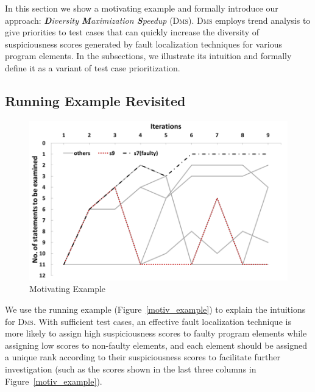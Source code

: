 
In this section we show a motivating example and formally introduce our approach: {\em \textbf{D}iversity \textbf{M}aximization \textbf{S}peedup} (\textsc{Dms}). \textsc{Dms} employs trend analysis to give priorities to test cases that can quickly increase the diversity of suspiciousness scores generated by fault localization techniques for various program elements.
In the subsections, we illustrate its intuition and formally define it as a variant of test case prioritization.

\subsection{Running Example Revisited}\label{sec.motive}



\begin{figure}[!htbp]
    \centering
    \includegraphics[width=12cm]{motive_1.png}
    \caption{Motivating Example}
    \label{fig:motive_1}
\end{figure}

We use the running example (Figure~\ref{motiv_example}) to explain the intuitions for
\textsc{Dms}. With sufficient test cases, an effective fault localization technique is more likely to assign high suspiciousness scores to faulty program elements while assigning low scores to non-faulty elements, and each element should be assigned a unique rank according to their suspiciousness scores to facilitate further investigation (such as the scores shown in the last three columns in Figure~\ref{motiv_example}).

